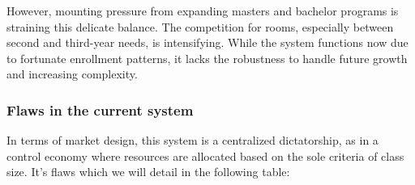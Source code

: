 \documentclass[a4paper, oneside]{article}
\theoremstyle{plain}
\begin{document}
However, mounting pressure from expanding masters and bachelor programs is straining this delicate balance. The competition for rooms,
especially between second and third-year needs, is intensifying. While the system functions now due to fortunate enrollment patterns,
it lacks the robustness to handle future growth and increasing complexity.

\subsubsection{Flaws in the current system}
In terms of market design, this system is a centralized dictatorship, as in a control economy where resources are allocated based on the sole criteria of class size. It's flaws which we will detail in the following table:\\
\end{document}
